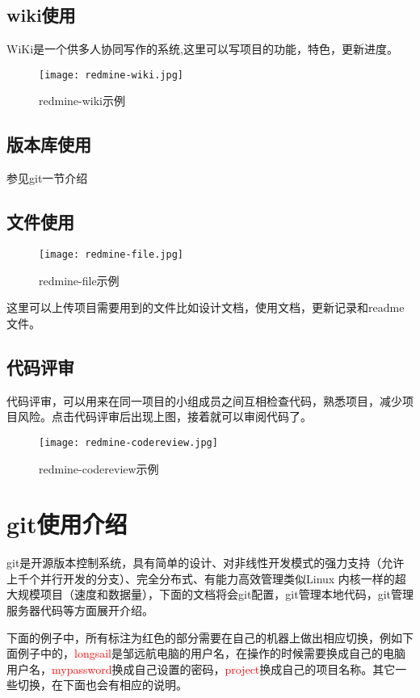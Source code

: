 \clearpage
\subsection{wiki使用}

WiKi是一个供多人协同写作的系统,这里可以写项目的功能，特色，更新进度。

\begin{figure}[htpd]
 \centering
 \texttt{[image: redmine-wiki.jpg]}
 \caption{redmine-wiki示例}
\end{figure}

\subsection{版本库使用}

参见git一节介绍

\subsection{文件使用}

\begin{figure}[htpd]
 \centering
 \texttt{[image: redmine-file.jpg]}
 \caption{redmine-file示例}
\end{figure}

这里可以上传项目需要用到的文件比如设计文档，使用文档，更新记录和readme文件。

\clearpage
\subsection{代码评审}

代码评审，可以用来在同一项目的小组成员之间互相检查代码，熟悉项目，减少项目风险。点击代码评审后出现上图，接着就可以审阅代码了。
\begin{figure}[htpd]
 \centering
 \texttt{[image: redmine-codereview.jpg]}
 \caption{ redmine-codereview示例}
\end{figure}

\section{git使用介绍}

git是开源版本控制系统，具有简单的设计、对非线性开发模式的强力支持（允许上千个并行开发的分支）、完全分布式、有能力高效管理类似Linux 内核一样的超大规模项目（速度和数据量），下面的文档将会git配置，git管理本地代码，git管理服务器代码等方面展开介绍。

下面的例子中，所有标注为红色的部分需要在自己的机器上做出相应切换，例如下面例子中的，\textcolor{red}{longsail}是邹远航电脑的用户名，在操作的时候需要换成自己的电脑用户名，\textcolor{red}{mypassword}换成自己设置的密码，\textcolor{red}{project}换成自己的项目名称。其它一些切换，在下面也会有相应的说明。

